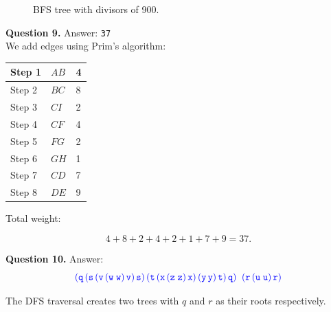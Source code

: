 \documentclass[jou]{apa6}
\begin{document}
\begin{figure}[!htb]
\caption{\label{fig:divisors-of-900} BFS tree with divisors of 900.}
\end{figure}



\vspace{4pt}
{\bf Question 9.} Answer: {\tt 37} \\

We add edges using Prim's algorithm: 

\begin{tabular}{|l|l|l|} \hline
Step 1 & $AB$ & 4 \\ \hline
Step 2 & $BC$ & 8 \\ \hline
Step 3 & $CI$ & 2 \\ \hline
Step 4 & $CF$ & 4 \\ \hline
Step 5 & $FG$ & 2 \\ \hline
Step 6 & $GH$ & 1 \\ \hline
Step 7 & $CD$ & 7 \\ \hline
Step 8 & $DE$ & 9 \\ \hline
\end{tabular}


Total weight: 

$$4 + 8 + 2 + 4 + 2 + 1 + 7 + 9 = 37.$$


\vspace{4pt}
{\bf Question 10.} Answer:\\

$$\textcolor{blue}{\mathtt{(q\,(s\,(v\,(w\;w)\,v)\,s)\,(t\,(x\,(z\;z)\,x)\,(y\,y)\,t)\,q)\;\;(r\,(u\;u)\,r)}}$$

The DFS traversal creates two trees 
with $q$ and $r$ as their roots respectively.
\end{document}
